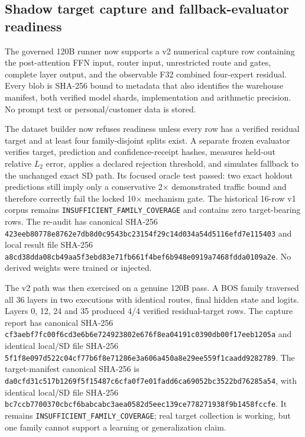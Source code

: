 \subsection{Shadow target capture and fallback-evaluator readiness}

The governed 120B runner now supports a v2 numerical capture row containing
the post-attention FFN input, router input, unrestricted route and gates,
complete layer output, and the observable F32 combined four-expert residual.
Every blob is SHA-256 bound to metadata that also identifies the warehouse
manifest, both verified model shards, implementation and arithmetic precision.
No prompt text or personal/customer data is stored.

The dataset builder now refuses readiness unless every row has a verified
residual target and at least four family-disjoint splits exist.  A separate
frozen evaluator verifies target, prediction and confidence-receipt hashes,
measures held-out relative $L_2$ error, applies a declared rejection threshold,
and simulates fallback to the unchanged exact SD path.  Its focused oracle test
passed: two exact holdout predictions still imply only a conservative
2$\times$ demonstrated traffic bound and therefore correctly fail the locked
10$\times$ mechanism gate.  The historical 16-row v1 corpus remains
\texttt{INSUFFICIENT\_FAMILY\_COVERAGE} and contains zero target-bearing rows.
The re-audit has canonical SHA-256
\texttt{423eeb80778e8762e7db8d0c9543bc23154f29c14d034a54d5116efd7e115403}
and local result file SHA-256
\texttt{a8cd38dda08cb49aa5f3ebd83e71fb661f4bef6b948e0919a7468fdda0109a2e}.
No derived weights were trained or injected.

The v2 path was then exercised on a genuine 120B pass.  A BOS family traversed
all 36 layers in two executions with identical routes, final hidden state and
logits.  Layers 0, 12, 24 and 35 produced 4/4 verified residual-target rows.
The capture report has canonical SHA-256
\texttt{cf3aebf7fc00f6cd3e6b6e724923802e676f8ea04191c0390db00f17eeb1205a}
and identical local/SD file SHA-256
\texttt{5f1f8e097d522c04cf77b6f8e71286e3a606a450a8e29ee559f1caadd9282789}.
The target-manifest canonical SHA-256 is
\texttt{da0cfd31c517b1269f5f15487c6cfa0f7e01fadd6ca69052bc3522bd76285a54},
with identical local/SD file SHA-256
\texttt{bc7ccb7700370cbcf6babcabc3aea0582d5eec139ce778271938f9b1458fccfe}.
It remains \texttt{INSUFFICIENT\_FAMILY\_COVERAGE}; real target collection is
working, but one family cannot support a learning or generalization claim.

